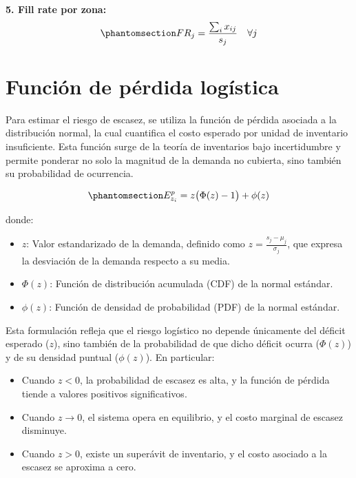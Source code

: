\documentclass[
  spanish,
  us-letterpaper,
]{scrreprt}
\providecommand{\tightlist}{%
  \setlength{\itemsep}{0pt}\setlength{\parskip}{0pt}}
\numberwithin{equation}{section}
\begin{document}
\textbf{5. Fill rate por zona:}
\begin{equation}\phantomsection\label{eq-5f}{
FR_j = \frac{\sum_i x_{ij}}{s_j} \quad \forall j 
}\end{equation}

\section{Función de pérdida
logística}\label{funciuxf3n-de-puxe9rdida-loguxedstica}

Para estimar el riesgo de escasez, se utiliza la función de pérdida
asociada a la distribución normal, la cual cuantifica el costo esperado
por unidad de inventario insuficiente. Esta función surge de la teoría
de inventarios bajo incertidumbre y permite ponderar no solo la magnitud
de la demanda no cubierta, sino también su probabilidad de ocurrencia.

\begin{equation}\phantomsection\label{eq-E_z}{
E_{z_i}^p = z \big( \Phi(z)-1 \big) + \phi(z) 
}\end{equation}

donde:

\begin{itemize}
\tightlist
\item
  \(z\): Valor estandarizado de la demanda, definido como
  \(\displaystyle z = \frac{s_j - \mu_j}{\sigma_j}\), que expresa la
  desviación de la demanda respecto a su media.\\
\item
  \(\Phi(z)\): Función de distribución acumulada (CDF) de la normal
  estándar.\\
\item
  \(\phi(z)\): Función de densidad de probabilidad (PDF) de la normal
  estándar.
\end{itemize}

Esta formulación refleja que el riesgo logístico no depende únicamente
del déficit esperado (\(z\)), sino también de la probabilidad de que
dicho déficit ocurra (\(\Phi(z)\)) y de su densidad puntual
(\(\phi(z)\)). En particular:

\begin{itemize}
\tightlist
\item
  Cuando \(z < 0\), la probabilidad de escasez es alta, y la función de
  pérdida tiende a valores positivos significativos.\\
\item
  Cuando \(z \to 0\), el sistema opera en equilibrio, y el costo
  marginal de escasez disminuye.\\
\item
  Cuando \(z > 0\), existe un superávit de inventario, y el costo
  asociado a la escasez se aproxima a cero.
\end{itemize}
\end{document}
